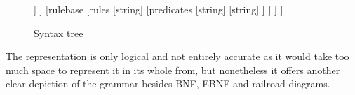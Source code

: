 \begin{figure}[!h]
	\centering
	\begin{forest}
		 [behavior
		 	[universe
				[symbol
					[string]
					[number]
					[number]
				]
			]
		 	[rulebase
				[rules
					[string]
					[predicates
						[string]
						[string]
					]
				]
			]
		 ]
	\end{forest}
	\caption{Syntax tree}
\end{figure}

The representation is only logical and not entirely accurate as it would take too much space to represent it in its whole from, but nonetheless it offers another clear depiction of the grammar besides BNF, EBNF and railroad diagrams.


